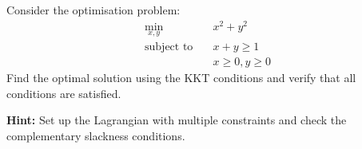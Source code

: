 \begin{problem}
\label{prob:kkt-conditions}
Consider the optimisation problem:
\begin{align}
\min_{x, y} \quad & x^2 + y^2 \\
\text{subject to} \quad & x + y \geq 1 \\
& x \geq 0, y \geq 0
\end{align}
Find the optimal solution using the KKT conditions and verify that all conditions are satisfied.

\textbf{Hint:} Set up the Lagrangian with multiple constraints and check the complementary slackness conditions.
\end{problem}
